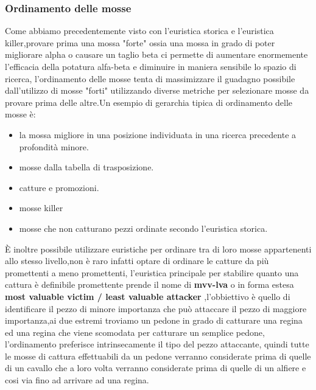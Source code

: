 \subsubsection{Ordinamento delle mosse}
Come abbiamo precedentemente visto con l'euristica storica e l'euristica killer,provare prima una mossa "forte" ossia una mossa in grado di 
poter migliorare alpha o causare un taglio beta ci permette di aumentare enormemente l'efficacia della potatura alfa-beta e diminuire in maniera 
sensibile lo spazio di ricerca, l'ordinamento delle mosse tenta di massimizzare il guadagno possibile dall'utilizzo di mosse "forti" utilizzando 
diverse metriche per selezionare mosse da provare prima delle altre.Un esempio di gerarchia tipica di ordinamento delle mosse è:
\begin{itemize}
\item la mossa migliore in una posizione individuata in una ricerca precedente a profondità minore.
\item mosse dalla tabella  di trasposizione.
\item catture e promozioni.
\item mosse killer
\item mosse che non catturano pezzi ordinate secondo l'euristica storica.
\end{itemize} 
È inoltre possibile utilizzare euristiche per ordinare tra di loro mosse appartenenti allo stesso livello,non è raro infatti optare di ordinare le catture da più promettenti a meno promettenti,
l'euristica principale per stabilire quanto una cattura è definibile promettente prende il nome di \textbf{mvv-lva} o in forma estesa \textbf{most valuable victim / least valuable attacker} ,l'obbiettivo è quello di identificare 
il pezzo di minore importanza che può attaccare il pezzo di maggiore importanza,ai due estremi troviamo un pedone in grado di catturare una regina ed una regina che viene scomodata per catturare un semplice pedone,
l'ordinamento preferisce intrinsecamente il tipo del pezzo attaccante, quindi tutte le mosse di cattura effettuabili da un pedone verranno considerate prima di quelle di un cavallo che a loro volta verranno considerate
prima di quelle di un alfiere e cosi via fino ad arrivare ad una regina. 


